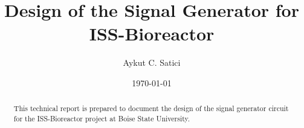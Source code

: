 \title{Design of the Signal Generator for ISS-Bioreactor}
\author         {Aykut C. Satici}
\date{\today}

\begin{abstract}
\noindent
This technical report is prepared to document the design of the signal generator
circuit for the ISS-Bioreactor project at Boise State University.
\end{abstract}

\maketitle

